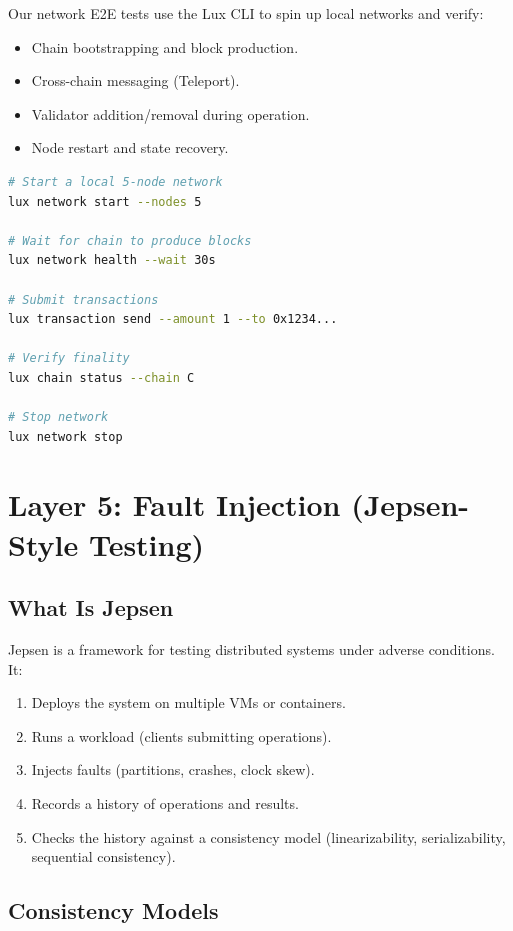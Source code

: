 \documentclass[11pt,a4paper]{article}
\begin{document}
Our network E2E tests use the Lux CLI to spin up local networks and verify:
\begin{itemize}[nosep]
  \item Chain bootstrapping and block production.
  \item Cross-chain messaging (Teleport).
  \item Validator addition/removal during operation.
  \item Node restart and state recovery.
\end{itemize}

\begin{lstlisting}[language=bash,caption={E2E test via Lux CLI}]
# Start a local 5-node network
lux network start --nodes 5

# Wait for chain to produce blocks
lux network health --wait 30s

# Submit transactions
lux transaction send --amount 1 --to 0x1234...

# Verify finality
lux chain status --chain C

# Stop network
lux network stop
\end{lstlisting}

\section{Layer 5: Fault Injection (Jepsen-Style Testing)}

\subsection{What Is Jepsen}

Jepsen is a framework for testing distributed systems under adverse conditions. It:
\begin{enumerate}[nosep]
  \item Deploys the system on multiple VMs or containers.
  \item Runs a workload (clients submitting operations).
  \item Injects faults (partitions, crashes, clock skew).
  \item Records a history of operations and results.
  \item Checks the history against a consistency model (linearizability, serializability,
    sequential consistency).
\end{enumerate}

\subsection{Consistency Models}
\end{document}
